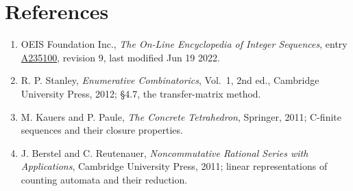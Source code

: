 \documentclass[11pt]{article}
\theoremstyle{definition}
\begin{document}
\section{References}

\begin{enumerate}

\item OEIS Foundation Inc., \emph{The On-Line Encyclopedia of Integer Sequences}, entry \href{https://oeis.org/A235100}{A235100}, revision 9, last modified Jun 19 2022.

\item R. P. Stanley, \emph{Enumerative Combinatorics}, Vol.~1, 2nd ed., Cambridge University Press, 2012; \S4.7, the transfer-matrix method.

\item M. Kauers and P. Paule, \emph{The Concrete Tetrahedron}, Springer, 2011; C-finite sequences and their closure properties.

\item J. Berstel and C. Reutenauer, \emph{Noncommutative Rational Series with Applications}, Cambridge University Press, 2011; linear representations of counting automata and their reduction.

\end{enumerate}
\end{document}
